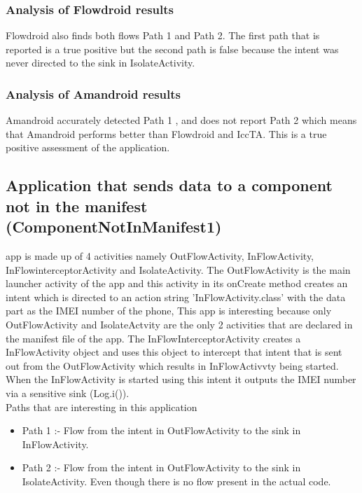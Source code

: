 \documentclass[journal]{IEEEtran}
\begin{document}
\subsubsection{Analysis of Flowdroid results}
Flowdroid also finds both flows Path 1 and Path 2. The first path that is reported is  a true positive but the second path is false because the intent was never directed to the sink in IsolateActivity.\\


\subsubsection{Analysis of Amandroid results}
Amandroid accurately detected Path 1 , and does not report Path 2 which means that Amandroid performs better than Flowdroid and IccTA. This is a true positive assessment of the application. 


\subsection{Application that sends data to a component not in the manifest (ComponentNotInManifest1)}

 app is made up of 4 activities namely OutFlowActivity, InFlowActivity, InFlowinterceptorActivity and IsolateActivity. The OutFlowActivity is the main launcher activity of the app and this activity in its onCreate method creates an intent which is directed to an action string 'InFlowActivity.class' with the data part as the IMEI number of the phone, This app is interesting because only OutFlowActivity and IsolateActvity are the only 2 activities that are declared in the manifest file of the app. The InFlowInterceptorActivity creates a InFlowActivity object and uses this object to intercept that intent that is sent out from the OutFlowActivity which results in InFlowActivvty being started. When the InFlowActivity is started using this intent it outputs the IMEI  number via a sensitive sink (Log.i()).\\
Paths that are interesting in this application
\begin{itemize}
	\item Path 1 :-  Flow from the intent in OutFlowActivity to the sink in InFlowActivity.
	\item Path 2 :-  Flow from the intent in OutFlowActivity to the sink in IsolateActivity. Even though there is no flow present in the actual code.
\end{itemize}
\end{document}
